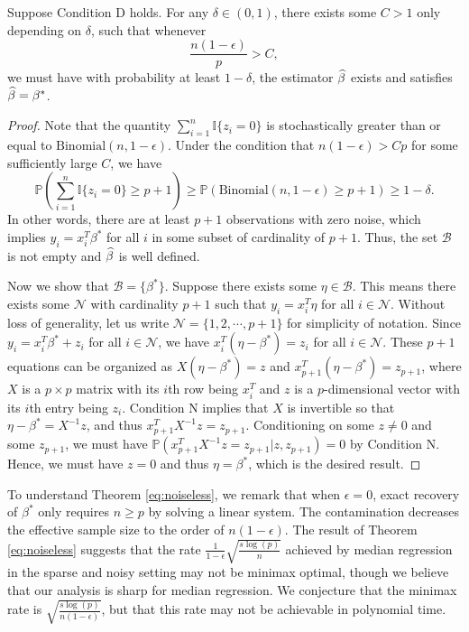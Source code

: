 \begin{thm}\label{eq:noiseless}
Suppose Condition D holds. For any $\delta\in(0,1)$, there exists some $C>1$ only depending on $\delta$, such that whenever
$$\frac{n(1-\epsilon)}{p}>C,$$
we must have with probability at least $1-\delta$, the estimator $\widehat{\beta}$ exists and satisfies $\widehat{\beta}=\beta^*$.
\end{thm}
\begin{proof}
Note that the quantity $\sum_{i=1}^n\mathbb{I}\{z_i=0\}$ is stochastically greater than or equal to $\text{Binomial}(n,1-\epsilon)$. Under the condition that $n(1-\epsilon)>Cp$ for some sufficiently large $C$, we have
$$\mathbb{P}\left(\sum_{i=1}^n\mathbb{I}\{z_i=0\}\geq p+1\right)\geq \mathbb{P}\left(\text{Binomial}(n,1-\epsilon)\geq p+1\right)\geq 1-\delta.$$
In other words, there are at least $p+1$ observations with zero noise, which implies $y_i=x_i^T\beta^*$ for all $i$ in some subset of cardinality of $p+1$. Thus, the set $\mathcal{B}$ is not empty and $\widehat{\beta}$ is well defined.

Now we show that $\mathcal{B}=\{\beta^*\}$. Suppose there exists some $\eta\in\mathcal{B}$. This means there exists some $\mathcal{N}$ with cardinality $p+1$ such that $y_i=x_i^T\eta$ for all $i\in\mathcal{N}$. Without loss of generality, let us write $\mathcal{N}=\{1,2,\cdots,p+1\}$ for simplicity of notation. Since $y_i=x_i^T\beta^*+z_i$ for all $i\in\mathcal{N}$, we have $x_i^T(\eta-\beta^*)=z_i$ for all $i\in\mathcal{N}$. These $p+1$ equations can be organized as $X(\eta-\beta^*)=z$ and $x_{p+1}^T(\eta-\beta^*)=z_{p+1}$, where $X$ is a $p\times p$ matrix with its $i$th row being $x_i^T$ and $z$ is a $p$-dimensional vector with its $i$th entry being $z_i$. Condition N implies that $X$ is invertible so that $\eta-\beta^*=X^{-1}z$, and thus $x_{p+1}^TX^{-1}z=z_{p+1}$. Conditioning on some $z\neq 0$ and some $z_{p+1}$, we must have $\mathbb{P}\left(x_{p+1}^TX^{-1}z=z_{p+1}|z,z_{p+1}\right)=0$ by Condition N. Hence, we must have $z=0$ and thus $\eta=\beta^*$, which is the desired result.
\end{proof}

To understand Theorem \ref{eq:noiseless}, we remark that when $\epsilon=0$, exact recovery of $\beta^*$ only requires $n\geq p$ by solving a linear system. The contamination decreases the effective sample size to the order of $n(1-\epsilon)$. The result of Theorem \ref{eq:noiseless} suggests that the rate $\frac{1}{1-\epsilon}\sqrt{\frac{s\log(p)}{n}}$ achieved by median regression in the sparse and noisy setting may not be minimax optimal, though we believe that our analysis is sharp for median regression. We conjecture that the minimax rate is $\sqrt{\frac{s\log(p)}{n(1-\epsilon)}}$, but that this rate may not be achievable in polynomial time.



